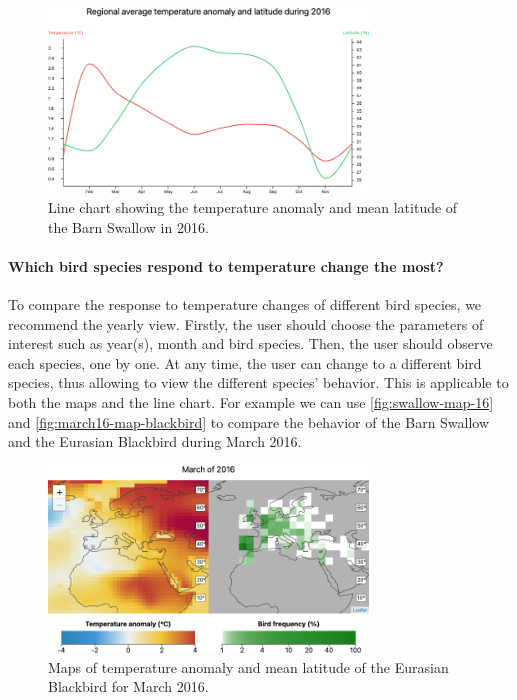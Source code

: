 \documentclass[journal]{vgtc}                %
\begin{document}
\begin{figure}[h]
  \centering
  \includegraphics[width=85mm]{montly-graph16-barnswallow}
    \caption{Line chart showing the temperature anomaly and mean latitude of the Barn Swallow in 2016.}
  \label{fig:montly-graph16}
\end{figure}

\paragraph{Which bird species respond to temperature change the most?}

To compare the response to temperature changes of different bird species, we recommend the yearly view. Firstly, the user should choose the parameters of interest such as year(s), month and bird species. Then, the user should observe each species, one by one. At any time, the user can change to a different bird species, thus allowing to view the different species' behavior. This is applicable to both the maps and the line chart. For example we can use \autoref{fig:swallow-map-16} and \autoref{fig:march16-map-blackbird} to compare the behavior of the Barn Swallow and the Eurasian Blackbird during March 2016.

\begin{figure}[h]
  \centering
  \includegraphics[width=85mm]{march16-map-blackbird}
  \caption{Maps of temperature anomaly and mean latitude of the Eurasian Blackbird for March 2016.}
  \label{fig:march16-map-blackbird}
\end{figure}
\end{document}
